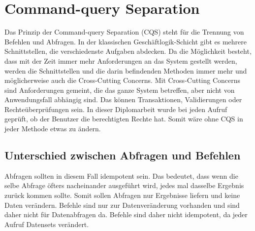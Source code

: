 \chapter{Command-query Separation}
Das Prinzip der Command-query Separation (CQS) steht für die Trennung von Befehlen und Abfragen. In der klassischen Geschäftlogik-Schicht gibt es mehrere Schnittstellen, die verschiedenste Aufgaben abdecken. Da die Möglichkeit besteht, dass  mit der Zeit immer mehr Anforderungen an das System gestellt werden, werden die Schnittstellen und die darin befindenden Methoden immer mehr und möglicherweise auch die Cross-Cutting Concerns. Mit Cross-Cutting Concerns sind Anforderungen gemeint, die das ganze System betreffen, aber nicht von Anwendungsfall abhängig sind. Das können Transaktionen, Validierungen oder Rechteüberprüfungen sein. In dieser Diplomarbeit wurde bei jeden Aufruf geprüft, ob der Benutzer die berechtigten Rechte hat. Somit wäre ohne CQS in jeder Methode etwas zu ändern. \autocite{cqsSOLIDeArchitektur}\\
\section{Unterschied zwischen Abfragen und Befehlen}
Abfragen sollten in diesem Fall idempotent sein. Das bedeutet, dass wenn die selbe Abfrage öfters nacheinander ausgeführt wird, jedes mal dasselbe Ergebnis zurück kommen sollte. Somit sollen Abfragen nur Ergebnisse liefern und keine Daten verändern.
Befehle sind nur zur Datenveränderung vorhanden und sind daher nicht für Datenabfragen da. Befehle sind daher nicht idempotent, da jeder Aufruf Datensets verändert.
